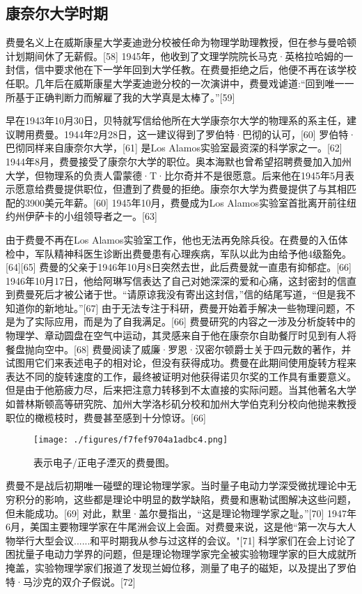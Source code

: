 \subsection{康奈尔大学时期}
费曼名义上在威斯康星大学麦迪逊分校被任命为物理学助理教授，但在参与曼哈顿计划期间休了无薪假。[58] 1945年，他收到了文理学院院长马克·英格拉哈姆的一封信，信中要求他在下一学年回到大学任教。在费曼拒绝之后，他便不再在该学校任职。几年后在威斯康星大学麦迪逊分校的一次演讲中，费曼戏谑道:“回到唯一一所基于正确判断力而解雇了我的大学真是太棒了。”[59]

早在1943年10月30日，贝特就写信给他所在大学康奈尔大学的物理系的系主任，建议聘用费曼。1944年2月28日，这一建议得到了罗伯特·巴彻的认可，[60] 罗伯特·巴彻同样来自康奈尔大学，[61] 是Los Alamos实验室最资深的科学家之一。[62] 1944年8月，费曼接受了康奈尔大学的职位。奥本海默也曾希望招聘费曼加入加州大学，但物理系的负责人雷蒙德·T·比尔奇并不是很愿意。后来他在1945年5月表示愿意给费曼提供职位，但遭到了费曼的拒绝。康奈尔大学为费曼提供了与其相匹配的3900美元年薪。[60] 1945年10月，费曼成为Los Alamos实验室首批离开前往纽约州伊萨卡的小组领导者之一。[63]

由于费曼不再在Los Alamos实验室工作，他也无法再免除兵役。在费曼的入伍体检中，军队精神科医生诊断出费曼患有心理疾病，军队以此为由给予他4级豁免。[64][65] 费曼的父亲于1946年10月8日突然去世，此后费曼就一直患有抑郁症。[66] 1946年10月17日，他给阿琳写信表达了自己对她深深的爱和心痛，这封密封的信直到费曼死后才被公诸于世。“请原谅我没有寄出这封信，”信的结尾写道，“但是我不知道你的新地址。”[67] 由于无法专注于科研，费曼开始着手解决一些物理问题，不是为了实际应用，而是为了自我满足。[66] 费曼研究的内容之一涉及分析旋转中的物理学、章动圆盘在空气中运动，其灵感来自于他在康奈尔自助餐厅时见到有人将餐盘抛向空中。[68] 费曼阅读了威廉·罗恩·汉密尔顿爵士关于四元数的著作，并试图用它们来表述电子的相对论，但没有获得成功。费曼在此期间使用旋转方程来表达不同的旋转速度的工作，最终被证明对他获得诺贝尔奖的工作具有重要意义。但是由于他筋疲力尽，后来把注意力转移到不太直接的实际问题。当其他著名大学如普林斯顿高等研究院、加州大学洛杉矶分校和加州大学伯克利分校向他抛来教授职位的橄榄枝时，费曼甚至感到十分惊讶。[66]
\begin{figure}[ht]
\centering
\texttt{[image: ./figures/f7fef9704a1adbc4.png]}
\caption{表示电子/正电子湮灭的费曼图。} \label{fig_Feynma_4}
\end{figure}
费曼不是战后初期唯一碰壁的理论物理学家。当时量子电动力学深受微扰理论中无穷积分的影响，这些都是理论中明显的数学缺陷，费曼和惠勒试图解决这些问题，但未能成功。[69] 对此，默里·盖尔曼指出，“这是理论物理学家之耻。”[70] 1947年6月，美国主要物理学家在牛尾洲会议上会面。对费曼来说，这是他“第一次与大人物举行大型会议......和平时期我从参与过这样的会议。"[71] 科学家们在会上讨论了困扰量子电动力学界的问题，但是理论物理学家完全被实验物理学家的巨大成就所掩盖，实验物理学家们报道了发现兰姆位移，测量了电子的磁矩，以及提出了罗伯特·马沙克的双介子假说。[72]

